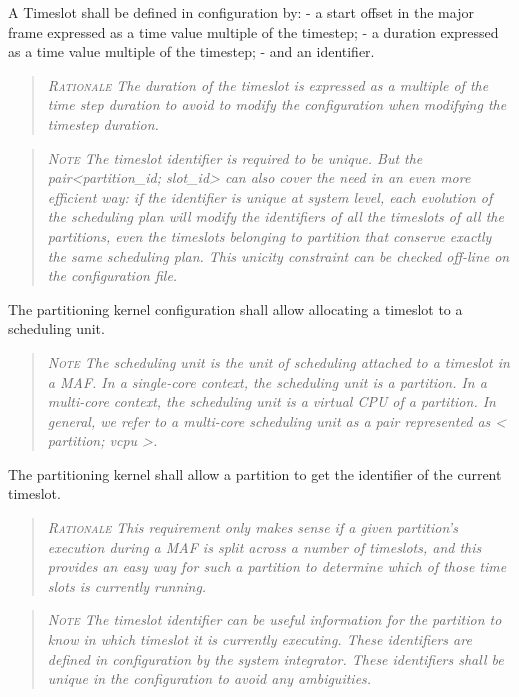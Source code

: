 A Timeslot shall be defined in configuration by:
- a start offset in the major frame expressed as a time value multiple of the timestep;
- a duration expressed as a time value multiple of the timestep;
- and an identifier.
\begin{quote}\it
\textsc{Rationale}
The duration of the timeslot is expressed as a multiple of the time step duration to avoid to modify the configuration when modifying the timestep duration.
\end{quote}
\begin{quote}\it
\textsc{Note}
The timeslot identifier is required to be unique. But the pair<partition\_id; slot\_id> can also cover the need in an even more efficient way: if the identifier is unique at system level, each evolution of the scheduling plan will modify the identifiers of all the timeslots of all the partitions, even the timeslots belonging to partition that conserve exactly the same scheduling plan.
This unicity constraint can be checked off-line on the configuration file.
\end{quote}

The partitioning kernel configuration shall allow allocating a timeslot to a scheduling unit.
\begin{quote}\it
\textsc{Note}
The scheduling unit is the unit of scheduling attached to a timeslot in a MAF. In a single-core context, the scheduling unit is a partition. In a multi-core context, the scheduling unit is a virtual CPU of a partition. In general, we refer to a multi-core scheduling unit as a pair represented as < partition; vcpu >.
\end{quote}

The partitioning kernel shall allow a partition to get the identifier of the current timeslot.
\begin{quote}\it
\textsc{Rationale}
This requirement only makes sense if a given partition's execution during a MAF is split across a number of timeslots, and this provides an easy way for such a partition to determine which of those time slots is currently running.
\end{quote}
\begin{quote}\it
\textsc{Note}
The timeslot identifier can be useful information for the partition to know in which timeslot it is currently executing. These identifiers are defined in configuration by the system integrator. These identifiers shall be unique in the configuration to avoid any ambiguities.
\end{quote}

